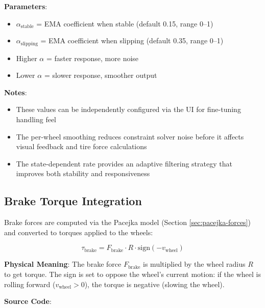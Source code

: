 \textbf{Parameters}:
\begin{itemize}
  \item $\alpha_{\text{stable}}$ = EMA coefficient when stable (default 0.15, range 0–1)
  \item $\alpha_{\text{slipping}}$ = EMA coefficient when slipping (default 0.35, range 0–1)
  \item Higher $\alpha$ = faster response, more noise
  \item Lower $\alpha$ = slower response, smoother output
\end{itemize}

\textbf{Notes}:
\begin{itemize}
  \item These values can be independently configured via the UI for fine-tuning handling feel
  \item The per-wheel smoothing reduces constraint solver noise before it affects visual feedback and tire force calculations
  \item The state-dependent rate provides an adaptive filtering strategy that improves both stability and responsiveness
\end{itemize}

\subsection{Brake Torque Integration}

Brake forces are computed via the Pacejka model (Section \ref{sec:pacejka-forces}) and converted to torques applied to the wheels:

\begin{equation}
  \tau_{\text{brake}} = F_{\text{brake}} \cdot R \cdot \text{sign}(-v_{\text{wheel}})
  \label{eq:brake-torque}
\end{equation}

\textbf{Physical Meaning}: The brake force $F_{\text{brake}}$ is multiplied by the wheel radius $R$ to get torque. The sign is set to oppose the wheel's current motion: if the wheel is rolling forward ($v_{\text{wheel}} > 0$), the torque is negative (slowing the wheel).

\textbf{Source Code}: 

